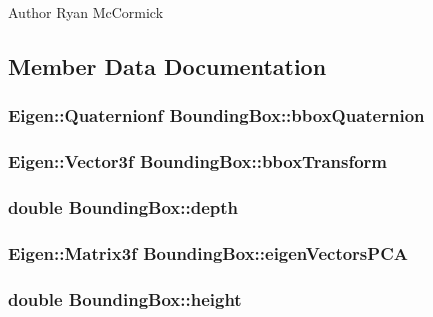 \begin{DoxyAuthor}{Author}
Ryan Mc\-Cormick 
\end{DoxyAuthor}


\subsection{Member Data Documentation}
\hypertarget{structBoundingBox_aa620a944c2b9b9bfa35dc60bae834656}{
\subsubsection[{bbox\-Quaternion}]{\setlength{\rightskip}{0pt plus 5cm}Eigen\-::\-Quaternionf Bounding\-Box\-::bbox\-Quaternion}}\label{structBoundingBox_aa620a944c2b9b9bfa35dc60bae834656}
\hypertarget{structBoundingBox_a71142840ea760b550a09c465e38dd802}{
\subsubsection[{bbox\-Transform}]{\setlength{\rightskip}{0pt plus 5cm}Eigen\-::\-Vector3f Bounding\-Box\-::bbox\-Transform}}\label{structBoundingBox_a71142840ea760b550a09c465e38dd802}
\hypertarget{structBoundingBox_ab8c3f78abef6754dbd5e4cc1a30a8c34}{
\subsubsection[{depth}]{\setlength{\rightskip}{0pt plus 5cm}double Bounding\-Box\-::depth}}\label{structBoundingBox_ab8c3f78abef6754dbd5e4cc1a30a8c34}
\hypertarget{structBoundingBox_ab55f4729c19bfba70ddabb37d3edacf9}{
\subsubsection[{eigen\-Vectors\-P\-C\-A}]{\setlength{\rightskip}{0pt plus 5cm}Eigen\-::\-Matrix3f Bounding\-Box\-::eigen\-Vectors\-P\-C\-A}}\label{structBoundingBox_ab55f4729c19bfba70ddabb37d3edacf9}
\hypertarget{structBoundingBox_ad8b207c019e3ee84f340fe749bcbedb4}{
\subsubsection[{height}]{\setlength{\rightskip}{0pt plus 5cm}double Bounding\-Box\-::height}}\label{structBoundingBox_ad8b207c019e3ee84f340fe749bcbedb4}
